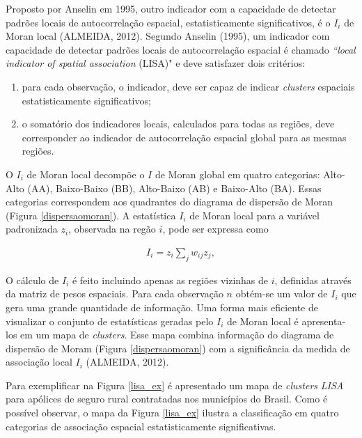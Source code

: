 \documentclass[12pt, a4paper,brazil,oneside]{article}
\begin{document}
	
	Proposto por Anselin em 1995, outro indicador com a capacidade de detectar padrões locais de autocorrelação espacial, estatisticamente significativos, é o $I_i$ de Moran local (ALMEIDA, 2012). Segundo Anselin (1995), um indicador com capacidade de detectar padrões locais de autocorrelação espacial é chamado \textit{``local indicator of spatial association} (LISA)" e deve satisfazer dois critérios: 
	
	\begin{enumerate}
		\item para cada observação, o indicador, deve ser capaz de indicar \textit{clusters} espaciais estatisticamente significativos;
		\item o somatório dos indicadores locais, calculados para todas as regiões, deve corresponder ao indicador de autocorrelação espacial global para as mesmas regiões.
	\end{enumerate}
	
	O $I_i$ de Moran local decompõe o $I$ de Moran global em quatro categorias: Alto-Alto (AA), Baixo-Baixo (BB), Alto-Baixo (AB) e  Baixo-Alto (BA). Essas categorias correspondem aos quadrantes do diagrama de dispersão de Moran (Figura \ref{dispersaomoran}). A estatística $I_i$ de Moran local para a variável padronizada $z_i$, observada na regão $i$, pode ser expressa como 
	
	\begin{align*}
	I_i = z_i \sum_{j}^{} w_{ij} z_j,
	\end{align*}
	
	O cálculo de $I_i$ é feito incluindo apenas as regiões vizinhas de $i$, definidas através da matriz de pesos espaciais. Para cada observação $n$ obtém-se um valor de $I_i$ que gera uma grande quantidade de informação. Uma forma mais eficiente de visualizar o conjunto de estatísticas geradas pelo $I_i$ de Moran local é apresenta-los em um mapa de \textit{clusters}. Esse mapa combina informação do diagrama de dispersão de Moram (Figura \ref{dispersaomoran}) com a significância da medida de associação local $I_i$ (ALMEIDA, 2012). 
	
	Para exemplificar na Figura \ref{lisa_ex} é apresentado um mapa de \textit{clusters} \textit{LISA} para apólices de seguro rural contratadas nos municípios do Brasil. Como é possível observar, o mapa da Figura \ref{lisa_ex} ilustra a classificação em quatro categorias de associação espacial estatisticamente significativas. 
	
\end{document}
